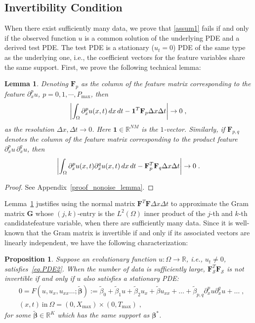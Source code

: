\documentclass[a4paper,11pt]{article}
\newcommand{\bbeta}{\bm{\beta}}
\newcommand{\bF}{\mathbf{F}}
\newcommand{\mS}{\mathcal{S}}
\newtheorem{lemma}{Lemma}[section]
\newtheorem{prop}{Proposition}[section]
\begin{document}
\subsection{Invertibility Condition}\label{sec.invertibility}
When there exist sufficiently many data, we prove that \eqref{assum1} fails if and only if the observed function $u$ is a common solution of the underlying PDE and a derived test PDE. The  test PDE is a stationary ($u_t=0$) PDE of the same type as the underlying one, i.e., the coefficient vectors for the feature variables share the same support. First, we prove the following technical lemma:
\begin{lemma}\label{nonoise_lemma}
Denoting $\bF_p$ as the column of the feature matrix corresponding to the feature $\partial_x^p u$, $p=0,1,\cdots,P_{\max}$, then
\begin{align}
	\abs{\int_\Omega \partial_x^pu(x,t)\,dx\,dt-\mathbf{1}^T\bF_p\Delta x\Delta t}\to 0\;,
\end{align}
as the resolution $\Delta x,\Delta t\to 0$. Here $\mathbf{1}\in\mathbb{R}^{NM}$ is the $1$-vector. Similarly, if $\bF_{p,q}$ denotes the column of the feature matrix corresponding to the product feature $\partial_x^pu\,\partial_x^qu$, then
\begin{align}
	\abs{\int_\Omega\partial_x^pu(x,t)\partial_x^qu(x,t)\,dx\,dt-\bF_{p}^T\bF_{q}\Delta x\Delta t}\to 0\;.
\end{align}
\end{lemma}
\begin{proof}
See Appendix~\ref{proof_nonoise_lemma}.	
\end{proof}

Lemma~\ref{nonoise_lemma} justifies using the normal matrix $\bF^T\bF\Delta x\Delta t$ to approximate the Gram matrix $\mathbf{G}$ whose $(j,k)$-entry is the $L^2(\Omega)$ inner product of the $j$-th and $k$-th  candidatefeature variable, when there are sufficiently many data. Since it is well-known that the Gram matrix is invertible if and only if its associated vectors are linearly independent, we have the following characterization:
\begin{prop}\label{prop.invert}Suppose an evolutionary function $u:\Omega\to\mathbb{R}$, i.e., $u_t\neq 0$, satisfies~\eqref{eq.PDE2}. When the number of data is sufficiently large,  $\bF_\mS^T\bF_\mS$ is not invertible if and only if $u$  also satisfies a stationary PDE:
\begin{align}
&0= F(u,u_x,u_{xx}\dots;\widetilde{\bbeta}):=\widetilde{\beta}_0+\widetilde{\beta}_1u+\widetilde{\beta}_2u_x+\widetilde{\beta}u_{xx}+\dots+\widetilde{\beta}_{p,q}\partial^p_xu\partial^q_xu+\dots	\;,\nonumber\\
&(x,t)~\text{in}~\Omega = (0,X_{\max})\times(0,T_{\max})\;,\label{eq.PDEtest}
\end{align}
for some  $\widetilde{\bbeta}\in\mathbb{R}^{K}$ which has the same support as $\bbeta^*$.
\end{prop}
\end{document}
